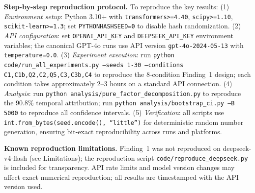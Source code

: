 \documentclass[11pt]{article}
\theoremstyle{definition}
\theoremstyle{remark}
\begin{document}
\textbf{Step-by-step reproduction protocol.} To reproduce the key results: (1) \textit{Environment setup}: Python 3.10+ with \texttt{transformers>=4.40}, \texttt{scipy>=1.10}, \texttt{scikit-learn>=1.3}; set \texttt{PYTHONHASHSEED=0} to disable hash randomization. (2) \textit{API configuration}: set \texttt{OPENAI\_API\_KEY} and \texttt{DEEPSEEK\_API\_KEY} environment variables; the canonical GPT-4o runs use API version \texttt{gpt-4o-2024-05-13} with \texttt{temperature=0.0}. (3) \textit{Experiment execution}: run \texttt{python code/run\_all\_experiments.py --seeds 1-30 --conditions C1,C1b,Q2,C2,Q5,C3,C3b,C4} to reproduce the 8-condition Finding~1 design; each condition takes approximately 2--3 hours on a standard API connection. (4) \textit{Analysis}: run \texttt{python analysis/pure\_factor\_decomposition.py} to reproduce the 90.8\% temporal attribution; run \texttt{python analysis/bootstrap\_ci.py --B 5000} to reproduce all confidence intervals. (5) \textit{Verification}: all scripts use \texttt{int.from\_bytes(seed.encode(), ``little'')} for deterministic random number generation, ensuring bit-exact reproducibility across runs and platforms.

\textbf{Known reproduction limitations.} Finding~1 was not reproduced on deepseek-v4-flash (see Limitations); the reproduction script \texttt{code/reproduce\_deepseek.py} is included for transparency. API rate limits and model version changes may affect exact numerical reproduction; all results are timestamped with the API version used.



\end{document}
